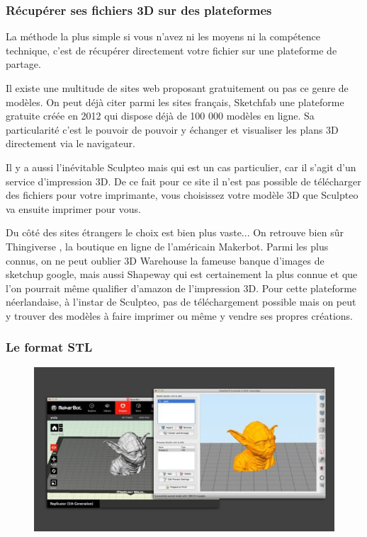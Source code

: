 \documentclass{article}
\begin{document}
\subsubsection{Récupérer ses fichiers 3D sur des plateformes}
La méthode la plus simple si vous n'avez ni les moyens ni la compétence technique, c'est de récupérer directement votre fichier sur une plateforme de partage.


Il existe une multitude de sites web proposant gratuitement ou pas ce genre de modèles. On peut déjà citer parmi les sites français, Sketchfab une plateforme gratuite créée en 2012 qui dispose déjà de 100 000 modèles en ligne. Sa particularité c'est le pouvoir de pouvoir y échanger et visualiser les plans 3D directement via le navigateur.

Il y a aussi l'inévitable Sculpteo mais qui est un cas particulier, car il s'agit d'un service d'impression 3D. De ce fait pour ce site il n'est pas possible de télécharger des fichiers pour votre imprimante, vous choisissez votre modèle 3D que Sculpteo va ensuite imprimer pour vous. 

Du côté des sites étrangers le choix est bien plus vaste... On retrouve bien sûr Thingiverse , la boutique en ligne de l'américain Makerbot. Parmi les plus connus, on ne peut oublier 3D Warehouse la fameuse banque d'images de sketchup google, mais aussi Shapeway qui est certainement la plus connue et que l'on pourrait même qualifier d'amazon de l'impression 3D. Pour cette plateforme néerlandaise, à l'instar de Sculpteo, pas de téléchargement possible mais on peut y trouver des modèles à faire imprimer ou même y vendre ses propres créations.
\newpage
\subsubsection{Le format STL}
\begin{figure}[h!]
\centering
\includegraphics[scale=0.4]{./images/fichier-stl.png}
\end{figure}\hfill 
\end{document}
